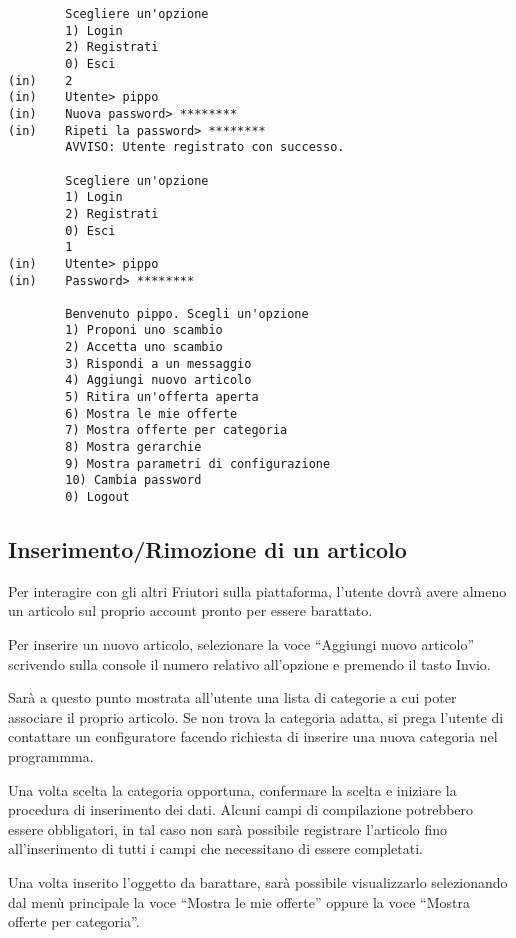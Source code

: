 \begin{lstlisting}
        Scegliere un'opzione
        1) Login
        2) Registrati
        0) Esci
(in)    2
(in)    Utente> pippo
(in)    Nuova password> ********
(in)    Ripeti la password> ********
        AVVISO: Utente registrato con successo.

        Scegliere un'opzione
        1) Login
        2) Registrati
        0) Esci
        1
(in)    Utente> pippo
(in)    Password> ********

        Benvenuto pippo. Scegli un'opzione
        1) Proponi uno scambio
        2) Accetta uno scambio
        3) Rispondi a un messaggio
        4) Aggiungi nuovo articolo
        5) Ritira un'offerta aperta
        6) Mostra le mie offerte
        7) Mostra offerte per categoria
        8) Mostra gerarchie
        9) Mostra parametri di configurazione
        10) Cambia password
        0) Logout
\end{lstlisting}

\subsection{Inserimento/Rimozione di un articolo}

Per interagire con gli altri Friutori sulla piattaforma, l'utente dovrà avere almeno un articolo sul proprio account pronto per essere barattato.

Per inserire un nuovo articolo, selezionare la voce ``Aggiungi nuovo articolo'' scrivendo sulla console il numero relativo all'opzione e premendo il tasto Invio.

Sarà a questo punto mostrata all'utente una lista di categorie a cui poter associare il proprio articolo. Se non trova la categoria adatta, si prega l'utente di contattare un configuratore facendo richiesta di inserire una nuova categoria nel programmma.

Una volta scelta la categoria opportuna, confermare la scelta e iniziare la procedura di inserimento dei dati. Alcuni campi di compilazione potrebbero essere obbligatori, in tal caso non sarà possibile registrare l'articolo fino all'inserimento di tutti i campi che necessitano di essere completati.

Una volta inserito l'oggetto da barattare, sarà possibile visualizzarlo selezionando dal menù principale la voce ``Mostra le mie offerte'' oppure la voce ``Mostra offerte per categoria''.

